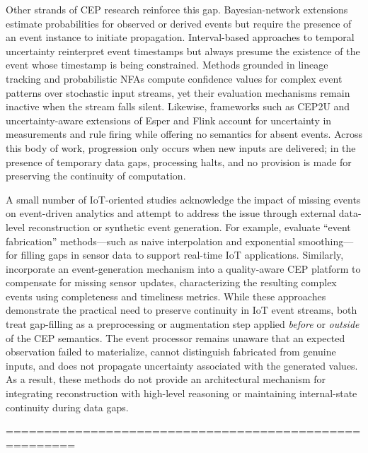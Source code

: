 Other strands of CEP research reinforce this gap. Bayesian-network extensions \cite{wasserkrug2010efficient, wasserkrug2012model} estimate probabilities for observed or derived events but require the presence of an event instance to initiate propagation. Interval-based approaches to temporal uncertainty \cite{zhang2013recognizing} reinterpret event timestamps but always presume the existence of the event whose timestamp is being constrained. Methods grounded in lineage tracking and probabilistic NFAs \cite{shen2008probabilistic, kawashima2010complex, chuanfei2010complex, wang2013complex} compute confidence values for complex event patterns over stochastic input streams, yet their evaluation mechanisms remain inactive when the stream falls silent. Likewise, frameworks such as CEP2U \cite{cugola2015introducing} and uncertainty-aware extensions of Esper and Flink \cite{moreno2019managing} account for uncertainty in measurements and rule firing while offering no semantics for absent events. Across this body of work, progression only occurs when new inputs are delivered; in the presence of temporary data gaps, processing halts, and no provision is made for preserving the continuity of computation.

A small number of IoT-oriented studies acknowledge the impact of missing events on event-driven analytics and attempt to address the issue through external data-level reconstruction or synthetic event generation. For example, \citet{gkoulis2025assessing} evaluate ``event fabrication'' methods—such as naive interpolation and exponential smoothing—for filling gaps in sensor data to support real-time IoT applications. Similarly, \citet{gkoulis2024hybrid} incorporate an event-generation mechanism into a quality-aware CEP platform to compensate for missing sensor updates, characterizing the resulting complex events using completeness and timeliness metrics. While these approaches demonstrate the practical need to preserve continuity in IoT event streams, both treat gap-filling as a preprocessing or augmentation step applied \emph{before} or \emph{outside} of the CEP semantics. The event processor remains unaware that an expected observation failed to materialize, cannot distinguish fabricated from genuine inputs, and does not propagate uncertainty associated with the generated values. As a result, these methods do not provide an architectural mechanism for integrating reconstruction with high-level reasoning or maintaining internal-state continuity during data gaps.


=======================================================
